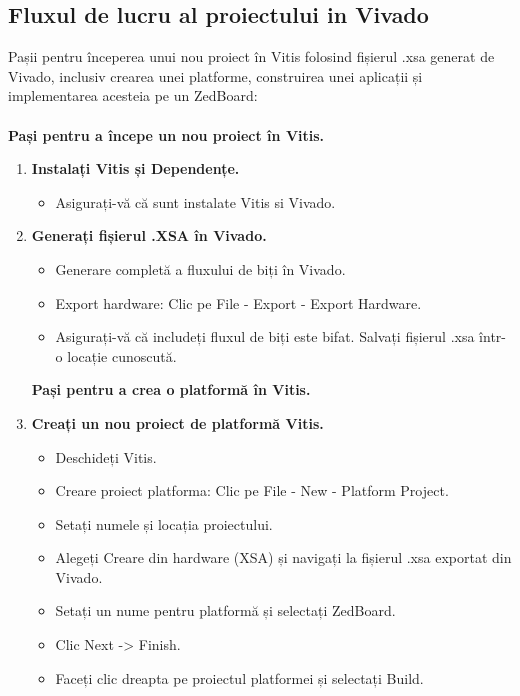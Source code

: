 \documentclass[12pt]{article}
\begin{document}
\subsection{Fluxul de lucru al proiectului in Vivado}
\hspace*{1cm}Pașii pentru începerea unui nou proiect în Vitis folosind fișierul .xsa generat de Vivado, inclusiv crearea unei platforme, construirea unei aplicații și implementarea acesteia pe un ZedBoard:\\\\
\hspace*{1cm} \textbf{Pași pentru a începe un nou proiect în Vitis.}
\begin{enumerate}
    \item \textbf{Instalați Vitis și Dependențe.} 
        \begin{itemize}
            \item Asigurați-vă că sunt instalate Vitis si Vivado.
        \end{itemize}
    \item \textbf{Generați fișierul .XSA în Vivado.} 
        \begin{itemize}
            \item Generare completă a fluxului de biți în Vivado.
            \item Export hardware: Clic pe File - Export - Export Hardware.
            \item Asigurați-vă că includeți fluxul de biți este bifat. Salvați fișierul .xsa într-o locație cunoscută.
        \end{itemize}
    \textbf{Pași pentru a crea o platformă în Vitis.}
    \item \textbf{Creați un nou proiect de platformă Vitis.} 
        \begin{itemize}
            \item Deschideți Vitis.
            \item Creare proiect platforma: Clic pe File - New - Platform Project.
            \item Setați numele și locația proiectului.
            \item Alegeți Creare din hardware (XSA) și navigați la fișierul .xsa exportat din Vivado.
            \item Setați un nume pentru platformă și selectați ZedBoard.
            \item Clic Next -> Finish.
            \item Faceți clic dreapta pe proiectul platformei și selectați Build.

\end{itemize}
\end{enumerate}
\end{document}
